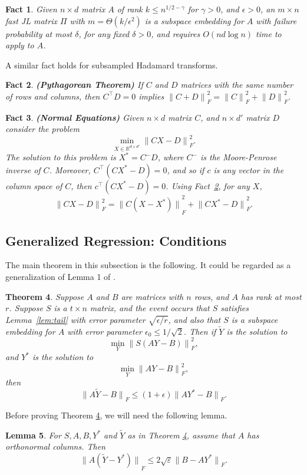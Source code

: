 \documentclass{sig-alternate}
\newcommand{\normF}[1]{{\| #1 \|}_F}
\newcommand{\ZZ}{S}
\newcommand{\eps}{\varepsilon}
\newtheorem{theorem}{Theorem}
\newtheorem{lemma}[theorem]{Lemma}
\newtheorem{fact}[theorem]{Fact}
\begin{document}
\begin{fact}\label{fact:subspace jl}
Given $n\times d$ matrix $A$ of rank $k\le n^{1/2-\gamma}$ for
$\gamma>0$, and $\epsilon > 0$, an $m\times n$
fast JL matrix $\Pi$ with $m=\Theta(k/\epsilon^2)$
is a subspace embedding for $A$ with failure probability at most $\delta$,
for any fixed $\delta>0$,
and requires $O(nd\log n)$ time to apply to $A$.
\end{fact}

A similar fact holds for subsampled Hadamard transforms.

\begin{fact}\label{fact:pyth}{\bf (Pythagorean Theorem)}
If $C$ and $D$ matrices with the same number of rows and columns,
then $C^\top D=0$ implies $\normF{C+D}^2 = \normF{C}^2 + \normF{D}^2$.
\end{fact}

\begin{fact}\label{fact:normal}{\bf (Normal Equations)}
Given $n\times d$ matrix $C$, and $n\times d'$ matrix
$D$ consider the problem
\[
\min_{X\in \mathbb{R}^{d\times d'}} \normF{CX-D}^2.
\]
The solution to this problem is $X^* = C^- D$, where $C^-$ is the Moore-Penrose
inverse of $C$.  Moreover, $C^\top (CX^*-D)=0$, and so
if $c$ is any vector in the column space of $C$,
then $c^\top (CX^*-D)=0$. Using Fact~\ref{fact:pyth}, for any $X$,
\[
\normF{CX-D}^2 = \normF{C(X-X^*)}^2 + \normF{CX^*-D}^2.
\]
\end{fact}
\fi 

\subsection{Generalized Regression: Conditions}

The main theorem in this subsection is the following. It could be regarded as a
generalization of Lemma 1 of \cite{dmms11}.
\begin{theorem}\label{thm:genReg}
Suppose $A$ and $B$ are matrices with $n$ rows,
and $A$ has rank at most $r$.
Suppose
$\ZZ $ is a $t \times n$ matrix,
and the event occurs that $\ZZ $ satisfies Lemma~\ref{lem:tail} with error
parameter $\sqrt{\epsilon/r}$,
and also that
$\ZZ $ is a subspace embedding for $A$ with 
error parameter $\epsilon_0 \le 1/\sqrt{2}$.
Then
if $\tilde{Y}$ is the solution to
\begin{equation}\label{eqn:approxls}
\min_{Y} \normF{\ZZ  (A Y - B)}^2,
\end{equation}
and $Y^*$ is the solution to
\begin{equation}\label{eqn:optls}
\min_{Y} \normF{A Y - B}^2,
\end{equation}
then
$$\normF{A\tilde{Y} - B} \le (1+\epsilon) \normF{A Y^* - B}.$$
\end{theorem}
\ifSTOC\else
Before proving Theorem \ref{thm:genReg}, we will need the following lemma.  
\begin{lemma}\label{lem:betabound}
For $\ZZ , A, B, Y^*$ and $\tilde{Y}$ as in Theorem \ref{thm:genReg},
assume that $A$ has orthonormal columns. Then
$$\normF{A(\tilde{Y}-Y^*)} \leq 2\sqrt{\eps}\normF{B-AY^*}.$$
\end{lemma}
\end{document}
